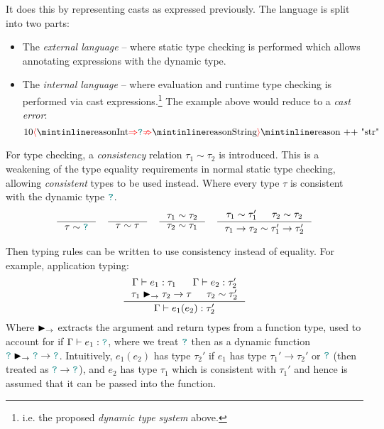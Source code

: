 It does this by representing casts as expressed previously. The language is split into two parts:
\begin{itemize}
\item The \textit{external language} -- where static type checking is performed which allows annotating expressions with the dynamic type.
\item The \textit{internal language} -- where evaluation and runtime type checking is performed via cast expressions.\footnote{i.e. the proposed \textit{dynamic type system} above.} The example above would reduce to a \textit{cast error}: \[10\scasterror{\code{Int}}{\code{String}}\code{ ++ "str"}\]
\end{itemize}
For type checking, a \textit{consistency} relation $\tau_1 \sim \tau_2$ is introduced. This is a weakening of the type equality requirements in normal static type checking, allowing \textit{consistent} types to be used instead. Where every type $\tau$ is consistent with the dynamic type ${\color{teal}\texttt{?}}$.
\[\inference{}{\tau \sim \dyn} \quad \inference{}{\tau \sim \tau} \quad \inference{\tau_1 \sim \tau_2}{\tau_2 \sim \tau_1} \quad \inference{\tau_1 \sim \tau_1' & \tau_2 \sim \tau_2}{\tau_1 \to \tau_2 \sim \tau_1' \to \tau_2'}\]

Then typing rules can be written to use consistency instead of equality. For example, application typing:
\[\inference{\Gamma \vdash e_1 : \tau_1 & \Gamma \vdash e_2 : \tau_2'\\ \tau_1 \funmatch \tau_2 \to \tau & \tau_2 \sim \tau_2'}{\Gamma \vdash e_1(e_2) : \tau_2'}\]
Where $\blacktriangleright_\rightarrow$ extracts the argument and return types from a function type, used to account for if $\Gamma \vdash e_1 : {\color{teal}\texttt{?}}$, where we treat ${\color{teal}\texttt{?}}$ then as a dynamic function ${\color{teal}\texttt{?}} \blacktriangleright_\rightarrow {\color{teal}\texttt{?}} \to {\color{teal}\texttt{?}}$.
Intuitively, $e_1(e_2)$ has type $\tau_2'$ if $e_1$ has type $\tau_1' \to \tau_2'$ or ${\color{teal}\texttt{?}}$ (then treated as ${\color{teal}\texttt{?}} \to {\color{teal}\texttt{?}}$), and $e_2$ has type $\tau_1$ which is consistent with $\tau_1'$ and hence is assumed that it can be passed into the function.

